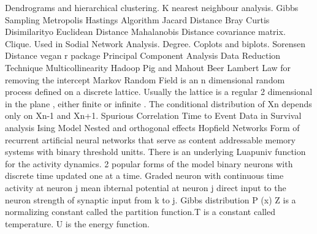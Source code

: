 



Dendrograms and hierarchical clustering.
K nearest neighbour analysis.
Gibbs Sampling
Metropolis Hastings Algorithm
Jacard Distance
Bray Curtis Disimilarityo
Euclidean Distance
Mahalanobis Distance covariance matrix.
Clique. Used in Sodial Network Analysis. Degree.
Coplots and biplots.
Sorensen Distance
vegan r package
Principal Component Analysis
Data Reduction Technique
Multicollinearity
Hadoop Pig and Mahout
Beer Lambert Law for removing the intercept
Markov Random Field is an n dimensional random process defined on a discrete lattice. Usually the lattice is a regular 2 dimensional in the plane , either finite or infinite . The conditional distribution of Xn depends  only on Xn-1 and Xn+1.
Spurious Correlation
Time to Event Data in Survival analysis  
Ising Model
Nested and orthogonal effects
Hopfield Networks
Form of recurrent artificial neural networks that serve as content addressable memory systems with binary threshold unitts. There is an underlying Luapuniv function for the activity dynamics.
 2 popular forms of the model
 binary neurons with discrete time updated one at a time.
Graded neuron with continuous time
activity at neuron j
mean ibternal potential at neuron j
direct input to the neuron 
strength of synaptic input from k to j.
Gibbs distribution
 P (x)  
Z is a normalizing constant called the partition function.T is a constant called temperature. U is the energy function.

